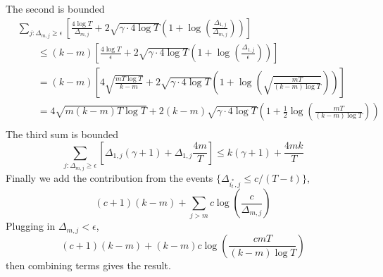 \documentclass[opre,blindrev]{informs3}
\begin{document}
\begin{APPENDICES}
    The second is bounded
    \begin{align*}
    &\sum_{j:\Delta_{m,j}\geq\epsilon}\left[\frac{4\log T}{\Delta_{m,j}}+2\sqrt{\gamma \cdot 4\log T}\left(1+\log\left(\frac{\Delta_{1,j}}{\Delta_{m,j}}\right)\right)\right]\\
    &\qquad \leq (k-m)\left[\frac{4\log T}{\epsilon}+2\sqrt{\gamma \cdot 4\log T}\left(1+\log\left(\frac{\Delta_{1,j}}{\epsilon}\right)\right)\right]\\
    &\qquad = (k-m)\left[4\sqrt{\frac{mT\log T}{k-m}}+2\sqrt{\gamma \cdot 4\log T}\left(1+\log\left(\sqrt{\frac{mT}{(k-m)\log T}}\right)\right)\right]\\
    &\qquad = 4\sqrt{m(k-m)T\log T}+2(k-m)\sqrt{\gamma \cdot 4\log T}\left(1+\frac{1}{2}\log\left(\frac{mT}{(k-m)\log T}\right)\right)\\
    \end{align*}
    The third sum is bounded
    \[\sum_{j:\Delta_{m,j}\geq\epsilon} \left[\Delta_{1,j}(\gamma + 1) + \Delta_{1,j}\frac{4m}{T}\right]\leq k(\gamma + 1) + \frac{4mk}{T}\]
    Finally we add the contribution from the events \(\{\Delta_{i^*_t,j}\leq c/(T-t)\}\),
    \[(c+1)(k-m) +\sum_{j>m}c\log\left(\frac{c}{\Delta_{m,j}}\right)\]
    Plugging in \(\Delta_{m,j}<\epsilon\),
    \[(c+1)(k-m) +(k-m)c\log\left(\frac{cmT}{(k-m)\log T}\right)\]
    then combining terms gives the result.
\Halmos


\end{APPENDICES}
\end{document}
